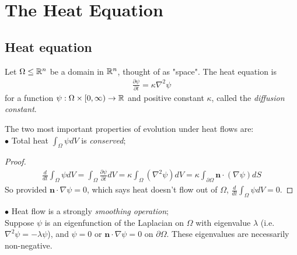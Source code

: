 \documentclass[a4paper]{article}
\begin{document}
\section{The Heat Equation}

\subsection{Heat equation}

Let $\Omega \leq \mathbb{R}^n$ be a domain in $\mathbb{R}^n$, thought of as "space". The heat equation is
\begin{equation*}
\begin{aligned}
\frac{\partial \psi}{\partial t} = \kappa \nabla^2 \psi
\end{aligned}
\end{equation*}
for a function $\psi: \Omega \times \left[0,\infty\right) \to \mathbb{R}$ and positive constant $\kappa$, called the \emph{diffusion constant}.

The two most important properties of evolution under heat flows are:\\
$\bullet$ Total heat $\int_\Omega \psi dV$ is \emph{conserved};

\begin{proof}
\begin{equation*}
\begin{aligned}
\frac{d}{dt}\int_\Omega \psi dV = \int_\Omega \frac{\partial\psi}{\partial t} dV = \kappa \int_\Omega \left(\nabla^2\psi\right) dV = \kappa \int_{\partial\Omega} \mathbf{n} \cdot \left(\nabla \psi\right) dS
\end{aligned}
\end{equation*}
So provided $\mathbf{n} \cdot \nabla \psi = 0$, which says heat doesn't flow out of $\Omega$, $\frac{d}{dt}\int_\Omega \psi dV = 0$.
\end{proof}
 
$\bullet$ Heat flow is a strongly \emph{smoothing operation};\\
Suppose $\psi$ is an eigenfunction of the Laplacian on $\Omega$ with eigenvalue $\lambda$ (i.e. $\nabla^2 \psi = -\lambda \psi$), and $\psi = 0$ or $\mathbf{n}\cdot \nabla\psi = 0$ on $\partial \Omega$. These eigenvalues are necessarily non-negative.
\end{document}
